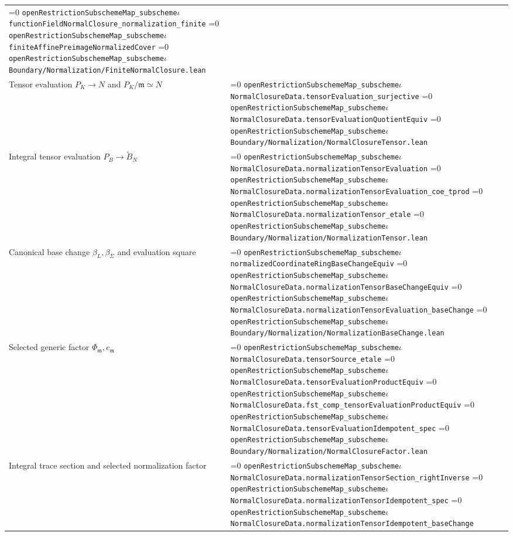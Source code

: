 \documentclass[11pt]{article}
\theoremstyle{definition}
\theoremstyle{remark}
\newcommand{\leanpath}[1]{%
  \ifnum\pdfstrcmp{\detokenize{#1}}%
      {\detokenize{openRestrictionSubschemeMap_subschemeι}}=0
    \texttt{\nolinkurl{openRestrictionSubschemeMap_subscheme}}\ensuremath{\iota}%
  \else
    \texttt{\nolinkurl{#1}}%
  \fi}
\begin{document}
\begin{longtable}{@{}>{\raggedright\arraybackslash}p{}
                >{\raggedright\arraybackslash}p{}@{}}
\leanpath{functionFieldNormalClosure_normalization_finite}\newline
\leanpath{finiteAffinePreimageNormalizedCover}\newline
\leanpath{Boundary/Normalization/FiniteNormalClosure.lean}\\
Tensor evaluation \(P_K\to N\) and \(P_K/\mathfrak m\simeq N\) &
\leanpath{NormalClosureData.tensorEvaluation_surjective}\newline
\leanpath{NormalClosureData.tensorEvaluationQuotientEquiv}\newline
\leanpath{Boundary/Normalization/NormalClosureTensor.lean}\\
Integral tensor evaluation \(P_B\to\widetilde B_N\) &
\leanpath{NormalClosureData.normalizationTensorEvaluation}\newline
\leanpath{NormalClosureData.normalizationTensorEvaluation_coe_tprod}\newline
\leanpath{NormalClosureData.normalizationTensor_etale}\newline
\leanpath{Boundary/Normalization/NormalizationTensor.lean}\\
Canonical base change \(\beta_L,\beta_\Sigma\) and evaluation square &
\leanpath{normalizedCoordinateRingBaseChangeEquiv}\newline
\leanpath{NormalClosureData.normalizationTensorBaseChangeEquiv}\newline
\leanpath{NormalClosureData.normalizationTensorEvaluation_baseChange}\newline
\leanpath{Boundary/Normalization/NormalizationBaseChange.lean}\\
Selected generic factor \(\Phi_{\mathfrak m},e_{\mathfrak m}\) &
\leanpath{NormalClosureData.tensorSource_etale}\newline
\leanpath{NormalClosureData.tensorEvaluationProductEquiv}\newline
\leanpath{NormalClosureData.fst_comp_tensorEvaluationProductEquiv}\newline
\leanpath{NormalClosureData.tensorEvaluationIdempotent_spec}\newline
\leanpath{Boundary/Normalization/NormalClosureFactor.lean}\\
Integral trace section and selected normalization factor &
\leanpath{NormalClosureData.normalizationTensorSection_rightInverse}\newline
\leanpath{NormalClosureData.normalizationTensorIdempotent_spec}\newline
\leanpath{NormalClosureData.normalizationTensorIdempotent_baseChange}\newline

\end{longtable}
\end{document}
